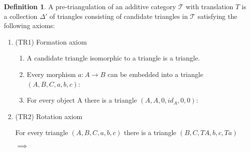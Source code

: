 \documentclass[12pt]{article}
\theoremstyle{definition}
\newtheorem{definition}{Definition}[section]
\theoremstyle{remark}
\begin{document}
            \begin{definition}
                A pre-triangulation of an additive category $\mathcal{T}$ with translation $T$ is a collection $\Delta '$ of triangles consisting of candidate triangles in $\mathcal{T}$ satisfying the following axioms: 

                \begin{enumerate}
                    \item (TR1) Formation axiom

                        \begin{enumerate}
                            \item A candidate triangle isomorphic to a triangle is a triangle.
                            \item Every morphism $a : A \rightarrow B$ can be embedded into a triangle $(A,B,C,a,b,c)$:
                            \begin{center}
                            \end{center}
                            \item For every object A there is a triangle $(A,A,0,id_A,0,0)$:
                            \begin{center}
                            \end{center}
                        \end{enumerate}
                    \item (TR2) Rotation axiom

                        For every triangle $(A,B,C,a,b,c)$ there is a triangle $(B,C,TA,b,c,Ta)$
                        \begin{center}
                             $\implies$
                            

\end{center}
\end{enumerate}
\end{definition}
\end{document}
